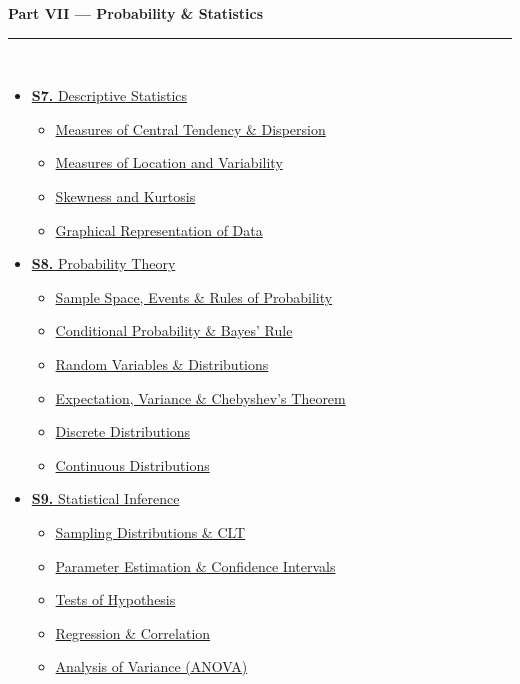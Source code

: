 \documentclass[12pt,a4paper]{article}
\begin{document}
\begin{tcolorbox}[breakable,colback=cG!5,colframe=cG,boxrule=1pt,arc=5pt,
  left=8pt,right=8pt,top=8pt,bottom=8pt,before skip=4pt]
  {\large\bfseries\textcolor{cG}{Part VII --- Probability \& Statistics}}\\[5pt]
  \textcolor{cG!40}{\rule{\textwidth}{0.4pt}}\\[3pt]
  \small\begin{itemize}[leftmargin=1.2em,itemsep=1pt,label={\textcolor{cG}{$\triangleright$}}]
    \item \hyperref[sec:S7]{\textbf{S7.} Descriptive Statistics}
      \begin{itemize}[leftmargin=1.5em,itemsep=0pt,label={\textcolor{cG}{$\cdot$}}]
        \item \hyperref[sub:s7-central]{Measures of Central Tendency \& Dispersion}
        \item \hyperref[sub:s7-measures]{Measures of Location and Variability}
        \item \hyperref[sub:s7-moments]{Skewness and Kurtosis}
        \item \hyperref[sub:s7-graphs]{Graphical Representation of Data}
      \end{itemize}
    \item \hyperref[sec:S8]{\textbf{S8.} Probability Theory}
      \begin{itemize}[leftmargin=1.5em,itemsep=0pt,label={\textcolor{cG}{$\cdot$}}]
        \item \hyperref[sub:s8-basic]{Sample Space, Events \& Rules of Probability}
        \item \hyperref[sub:s8-cond]{Conditional Probability \& Bayes' Rule}
        \item \hyperref[sub:s8-rv]{Random Variables \& Distributions}
        \item \hyperref[sub:s8-expect]{Expectation, Variance \& Chebyshev's Theorem}
        \item \hyperref[sub:s8-discrete]{Discrete Distributions}
        \item \hyperref[sub:s8-continuous]{Continuous Distributions}
      \end{itemize}
    \item \hyperref[sec:S9]{\textbf{S9.} Statistical Inference}
      \begin{itemize}[leftmargin=1.5em,itemsep=0pt,label={\textcolor{cG}{$\cdot$}}]
        \item \hyperref[sub:s9-sampling]{Sampling Distributions \& CLT}
        \item \hyperref[sub:s9-estimation]{Parameter Estimation \& Confidence Intervals}
        \item \hyperref[sub:s9-hypothesis]{Tests of Hypothesis}
        \item \hyperref[sub:s9-regression]{Regression \& Correlation}
        \item \hyperref[sub:s9-anova]{Analysis of Variance (ANOVA)}
      \end{itemize}
  \end{itemize}
\end{tcolorbox}
\end{document}
